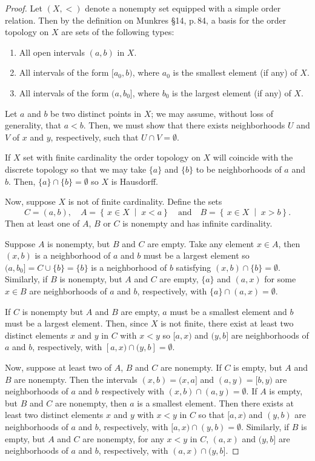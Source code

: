 \begin{proof}
Let $(X,<)$ denote a nonempty set equipped with a simple order
relation. Then by the definition on Munkres \S14, p.\,84, a basis
for the order topology on $X$ are sets of the following types:
\begin{enumerate}[noitemsep,label=(\arabic*)]
\item All open intervals $(a,b)$ in $X$.
\item All intervals of the form $[a_0,b)$, where $a_0$ is the
  smallest element (if any) of $X$.
\item All intervals of the form $(a,b_0]$, where $b_0$ is the
  largest element (if any) of $X$.
\end{enumerate}
Let $a$ and $b$ be two distinct points in $X$; we may assume,
without loss of generality, that $a<b$. Then, we must show that
there exists neighborhoods $U$ and $V$ of $x$ and $y$,
respectively, such that $U\cap V=\emptyset$.

If $X$ set with finite cardinality the order topology on $X$ will
coincide with the discrete topology so that we may take $\{a\}$
and $\{b\}$ to be neighborhoods of $a$ and $b$. Then,
$\{a\}\cap\{b\}=\emptyset$ so $X$ is Hausdorff.

Now, suppose $X$ is not of finite cardinality.  Define the sets
\[
C=(a,b),
\quad
A=\left\{\,x\in X\;\middle|\;x<a\right\}
\quad
\text{and}
\quad
B=\left\{\,x\in X\;\middle|\;x>b\right\}.
\]
Then at least one of $A$, $B$ or $C$ is nonempty and has infinite
cardinality.

Suppose $A$ is nonempty, but $B$ and $C$ are empty. Take any
element $x\in A$, then $(x,b)$ is a neighborhood of $a$ and $b$
must be a largest element so $(a,b_0]=C\cup\{b\}=\{b\}$ is a
neighborhood of $b$ satisfying
$(x,b)\cap\{b\}=\emptyset$. Similarly, if $B$ is nonempty, but
$A$ and $C$ are empty, $\{a\}$ and $(a,x)$ for some $x\in B$ are
neighborhoods of $a$ and $b$, respectively, with
$\{a\}\cap(a,x)=\emptyset$.

If $C$ is nonempty but $A$ and $B$ are empty, $a$ must be a
smallest element and $b$ must be a largest element. Then, since
$X$ is not finite, there exist at least two distinct elements $x$
and $y$ in $C$ with $x<y$ so $[a,x)$ and $(y,b]$ are
neighborhoods of $a$ and $b$, respectively, with
$[a,x)\cap(y,b]=\emptyset$.

Now, suppose at least two of $A$, $B$ and $C$ are nonempty. If
$C$ is empty, but $A$ and $B$ are nonempty. Then the intervals
$(x,b)=(x,a]$ and $(a,y)=[b,y)$ are neighborhoods of $a$ and $b$
respectively with $(x,b)\cap (a,y)=\emptyset$. If $A$ is empty,
but $B$ and $C$ are nonempty, then $a$ is a smallest
element. Then there exists at least two distinct elements $x$
and $y$ with $x<y$ in $C$ so that $[a,x)$ and $(y,b)$ are
neighborhoods of $a$ and $b$, respectively, with $[a,x)\cap
(y,b)=\emptyset$. Similarly, if $B$ is empty, but $A$ and $C$ are
nonempty, for any $x<y$ in $C$, $(a,x)$ and $(y,b]$ are
neighborhoods of $a$ and $b$, respectively, with $(a,x)\cap
(y,b]$.


\end{proof}
